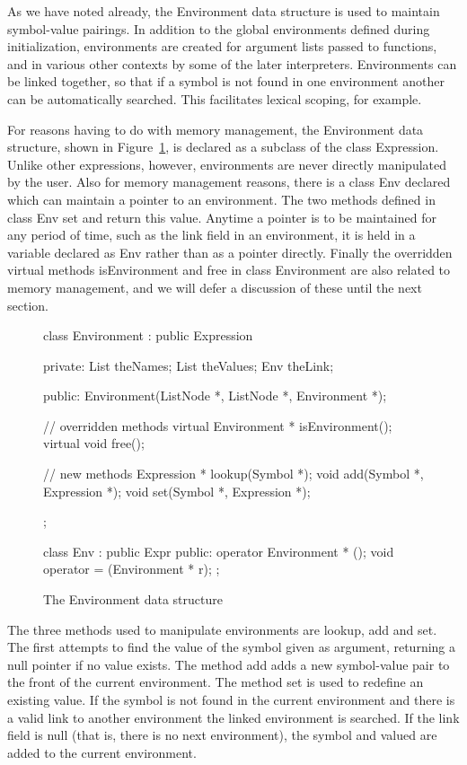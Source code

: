 As we have noted already, the {\sf Environment} data structure is used to
maintain symbol-value pairings.  In addition to the global environments
defined during initialization, environments are created for argument lists
passed to functions, and in various other contexts by some of the later
interpreters.  Environments can be linked together, so that if a symbol is
not found in one environment another can be automatically searched.
This facilitates lexical scoping, for example.

For reasons having to do with memory management, the {\sf Environment} data
structure, shown in Figure~\ref{environment}, is declared as a subclass of
the class {\sf Expression}.  Unlike other expressions, however,
environments are never directly manipulated by the user.
Also for memory management reasons, there is a class {\sf Env} declared
which can maintain a pointer to an environment.   The two methods defined
in class {\sf Env} set and return this value.   Anytime a pointer is to be
maintained for any period of time, such as the link field in an
environment, it is held in a variable declared as {\sf Env} rather than as
a pointer directly.
Finally the overridden virtual methods {\sf isEnvironment} and {\sf free} 
in class {\sf Environment} are also
related to memory management, and we will defer a discussion of these until
the next section.

\begin{figure}
\begin{cprog}
class Environment : public Expression {
private:
	List theNames;
	List theValues;
	Env theLink;

public:
	Environment(ListNode *, ListNode *, Environment *);

	// overridden methods
	virtual Environment * isEnvironment();
	virtual void free();

	// new methods
	Expression * lookup(Symbol *);
	void add(Symbol *, Expression *);
	void set(Symbol *, Expression *);
};

class Env : public Expr {
public:
	operator Environment * ();
	void operator = (Environment * r);
};
\end{cprog}
\caption{The {\sf Environment} data structure}\label{environment}
\end{figure}

The three methods used to manipulate environments are {\sf lookup}, {\sf
add} and {\sf set}.   The first attempts to find the value of the symbol
given as argument, returning a null pointer if no value exists.
The method {\sf add} adds a new symbol-value pair to the front of the current
environment.  The method {\sf set} is used to redefine an existing value.
If the symbol is not found in the current environment and there is a valid
link to another environment the linked environment is searched.  If the
link field is null (that is, there is no next environment), the symbol and
valued are {\sf add}ed to the current environment.

